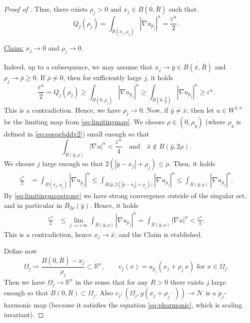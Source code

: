 \documentclass[12pt]{amsart}
\def\eps{\varepsilon}
\def\n{{\mathcal M}}
\def\n{{\mathcal{M}}}
\def\n{{\mathcal N}}
\newcommand{\R}{\mathbb{R}}
\numberwithin{theorem}{section} \numberwithin{equation}{section}
\begin{document}
\begin{proof}[Proof of ]
Thus, there exists  $\rho_j>0$ and $x_j \in \overline{B (0,\bar{R})}$ such that
\[
 Q_j(\rho_j) = \int_{B (x_j,\rho_j)} |\nabla u_{p_j}|^n = \frac{\eps^n}{2}.
\]

\underline{Claim:} $x_j \to 0$ and $\rho_j \to 0$.

Indeed, up to a subsequence, we may assume that $x_j \to \bar{y}\in \overline{B (\bar{x},\bar{R})}$ and $\rho_j \to \bar{\rho} \ge 0$. If $\bar{\rho}\neq 0$, then for sufficiently large $j$, it holds
\[
 \frac{\eps^n}{2} = Q_j(\rho_j) \ge \int_{B (0,\rho_j)}|\nabla u_{p_j}|^{n} \ge \int_{B (0,\frac{\bar{\rho}}{2})} |\nabla u_{p_j}|^{n} \ge \eps^n.
\]
This is a contradiction. Hence, we have $\rho_j\to 0 $.
Now, if $\bar{y}\neq \bar{x}$, then let $u\in W^{1,n}$ be the limiting map from \eqref{eq:limitingmap}. We choose $\rho\in (0,\rho_y)$ (where $\rho_y$ is defined in \eqref{eq:eqeqebddv2}) small enough so that
\[
 \int_{B (\bar{y},\rho)} |\nabla u|^n < \frac{\eps^n}{4} \quad \text{and}\quad \bar{x} \notin B (\bar{y},2\rho).
\]
We choose $j$ large enough so that $2(|\bar{y}-x_j|+\rho_j)\le \rho$. Then, it holds
\[
 \begin{split}
  \frac{\eps^{n}}{2} & = \int_{B (x_j,\rho_j)} |\nabla u_{p_j}|^{n} \le \int_{B \big(\bar{y}, 2(|\bar{y}-x_j|+\rho_j) \big)} |\nabla u_{p_j}|^{n} \le \int_{B (\bar{y},\rho)} |\nabla u_{p_j}|^{n}.
  \end{split}
\]
By \eqref{eq:limitingmapstrong} we have strong convergence outside of the singular set, and in particular in $B_{2\rho}(\bar{y})$. Hence, it holds
\[
\begin{split}
	\frac{\eps^{n}}{2}& \le \lim_{j\to +\infty} \int_{B (\bar{y},\rho)} |\nabla u_{p_j}|^{n} = \int_{B (\bar{y},\rho)} |\nabla u|^n < \frac{\eps^n}{4}.
\end{split}
\]
This is a contradiction, hence $x_j \to \bar{x}$, and the Claim is etablished.

Define now
\[
 \Omega_j \coloneqq \frac{  B (0,\bar{R}) -x_j }{\rho_j} \subset \R^n , \qquad v_j(x) = u_{p_j}\left( x_j + \rho_j\, x \right) \text{ for } x\in \Omega_j.
\]
Then we have $\Omega_j \to \R^n$ in the sense that for any $R>0$ there exists $j$ large enough so that $B (0,R) \subset \Omega_j$. Also $v_j\colon (\Omega_j ,g(x_j + \rho_j\cdot))\to \n$ is a $p_j$-harmonic map (because it satisfies the equation \eqref{eq:pharmonic}, which is scaling invariant).


\end{proof}
\end{document}
